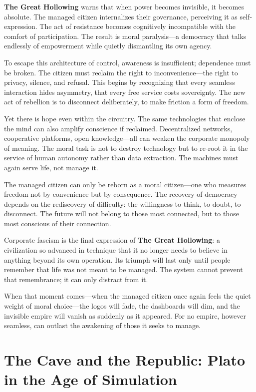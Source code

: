 \documentclass[11pt,twoside]{book}
\begin{document}
\textbf{The Great Hollowing} warns that when power becomes invisible, it becomes absolute.  The managed citizen internalizes their governance, perceiving it as self-expression.  The act of resistance becomes cognitively incompatible with the comfort of participation.  The result is moral paralysis—a democracy that talks endlessly of empowerment while quietly dismantling its own agency.

To escape this architecture of control, awareness is insufficient; dependence must be broken.  The citizen must reclaim the right to inconvenience—the right to privacy, silence, and refusal.  This begins by recognizing that every seamless interaction hides asymmetry, that every free service costs sovereignty.  The new act of rebellion is to disconnect deliberately, to make friction a form of freedom.

Yet there is hope even within the circuitry.  The same technologies that enclose the mind can also amplify conscience if reclaimed.  Decentralized networks, cooperative platforms, open knowledge—all can weaken the corporate monopoly of meaning.  The moral task is not to destroy technology but to re-root it in the service of human autonomy rather than data extraction.  The machines must again serve life, not manage it.

The managed citizen can only be reborn as a moral citizen—one who measures freedom not by convenience but by consequence.  The recovery of democracy depends on the rediscovery of difficulty: the willingness to think, to doubt, to disconnect.  The future will not belong to those most connected, but to those most conscious of their connection.

Corporate fascism is the final expression of \textbf{The Great Hollowing}: a civilization so advanced in technique that it no longer needs to believe in anything beyond its own operation.  Its triumph will last only until people remember that life was not meant to be managed.  The system cannot prevent that remembrance; it can only distract from it.

When that moment comes—when the managed citizen once again feels the quiet weight of moral choice—the logos will fade, the dashboards will dim, and the invisible empire will vanish as suddenly as it appeared.  For no empire, however seamless, can outlast the awakening of those it seeks to manage.

%
\chapter{The Cave and the Republic: Plato in the Age of Simulation}
\label{ch:23.2}
\end{document}
